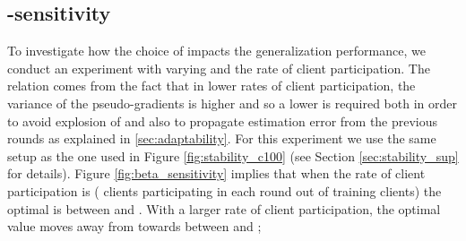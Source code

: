 \documentclass[runningheads]{llncs}
\begin{document}
\subsection{-sensitivity}

To investigate how the choice of  impacts the generalization performance, we conduct an experiment with varying  and the rate of client participation. The relation comes from the fact that in lower rates of client participation, the variance of the pseudo-gradients is higher and so a lower  is required both in order to avoid explosion of  and also to propagate estimation error from the previous rounds as explained in \ref{sec:adaptability}. For this experiment we use the same setup as the one used in Figure \ref{fig:stability_c100} (see Section \ref{sec:stability_sup} for details). Figure \ref{fig:beta_sensitivity} implies that when the rate of client participation is  ( clients participating in each round out of  training clients) the optimal  is between  and . With a larger rate of client participation, the optimal value moves away from  towards between  and ;
\end{document}
